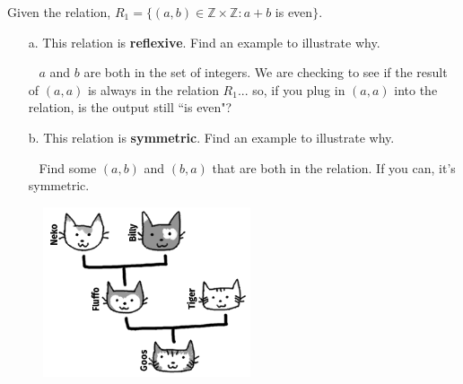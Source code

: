 \documentclass[a4paper,12pt]{book}
\newcounter{question}
\begin{document}
    \begin{questionNOGRADE}{\thequestion}

        Given the relation, $R_{1} = \{ (a,b) \in \mathbb{Z} \times \mathbb{Z} : a + b$ is even$\}$.

        \begin{itemize}
            \item[a.]   This relation is \textbf{reflexive}. Find an example to illustrate why.
                \begin{hint}{\ }
                    $a$ and $b$ are both in the set of integers. We are checking to see if the
                    result of $(a,a)$ is always in the relation $R_{1}$... so,
                    if you plug in $(a,a)$ into the relation, is the output still ``is even"?
                \end{hint}


            \item[b.]   This relation is \textbf{symmetric}. Find an example to illustrate why.
                \begin{hint}{\ }
                    Find some $(a,b)$ and $(b,a)$ that are both in the relation.
                    If you can, it's symmetric.
                \end{hint}

        \end{itemize}

    \end{questionNOGRADE}

\newpage

    \begin{figure} \includegraphics[height=5cm]{images/catfamily.png} \end{figure}
        
\end{document}
